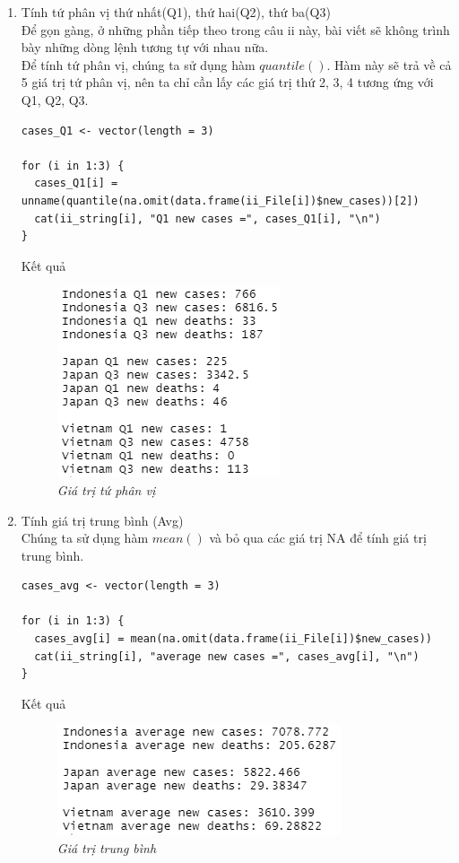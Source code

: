 \documentclass[a4paper]{article}
\theoremstyle{definition}
\begin{document}
\begin{enumerate}[1)]
    
\item Tính tứ phân vị thứ nhất(Q1), thứ hai(Q2), thứ ba(Q3)\\
    Để gọn gàng, ở những phần tiếp theo trong câu ii này, bài viết sẽ không trình bày những dòng lệnh tương tự với nhau nữa.\\
    Để tính tứ phân vị, chúng ta sử dụng hàm $quantile()$. Hàm này sẽ trả về cả 5 giá trị tứ phân vị, nên ta chỉ cần lấy các giá trị thứ 2, 3, 4 tương ứng với Q1, Q2, Q3.
    \begin{lstlisting}
cases_Q1 <- vector(length = 3)
    
for (i in 1:3) {
  cases_Q1[i] = unname(quantile(na.omit(data.frame(ii_File[i])$new_cases))[2])
  cat(ii_string[i], "Q1 new cases =", cases_Q1[i], "\n")
}
    \end{lstlisting}
    
    Kết quả
    \begin{figure}[H]
        \begin{center}
            \includegraphics[scale=0.7]{ii/quantile.png}
        \end{center}
        \vspace{+3mm}\caption{\it Giá trị tứ phân vị}
    \end{figure}
    
\item Tính giá trị trung bình (Avg)\\
    Chúng ta sử dụng hàm $mean()$ và bỏ qua các giá trị NA để tính giá trị trung bình.
    
    \begin{lstlisting}
cases_avg <- vector(length = 3)

for (i in 1:3) {
  cases_avg[i] = mean(na.omit(data.frame(ii_File[i])$new_cases))
  cat(ii_string[i], "average new cases =", cases_avg[i], "\n")
}
    \end{lstlisting}
    
        Kết quả
    \begin{figure}[H]
        \begin{center}
            \includegraphics[scale=0.7]{ii/avg.png}
        \end{center}
        \vspace{+3mm}\caption{\it Giá trị trung bình}
    \end{figure}
    

\end{enumerate}
\end{document}
